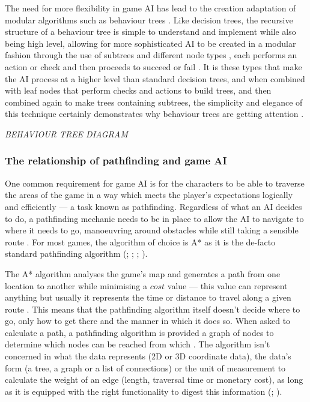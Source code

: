 \documentclass[11pt, a4paper]{article}
\begin{document}
The need for more flexibility in game AI has lead to the creation adaptation of modular algorithms such as behaviour trees \parencite[1]{lim2010evolving}. Like decision trees, the recursive structure of a behaviour tree is simple to understand and implement while also being high level, allowing for more sophisticated AI to be created in a modular fashion through the use of subtrees and different node types \parencite[144]{shoulson2011parameterizing}, each performs an action or check and then proceeds to succeed or fail \parencite[4]{lim2010evolving}. It is these types that make the AI process at a higher level than standard decision trees, and when combined with leaf nodes that perform checks and actions to build trees, and then combined again to make trees containing subtrees, the simplicity and elegance of this technique certainly demonstrates why behaviour trees are getting attention \parencite[144]{shoulson2011parameterizing}.

\emph{BEHAVIOUR TREE DIAGRAM}

\subsubsection{The relationship of pathfinding and game AI}

One common requirement for game AI is for the characters to be able to traverse the areas of the game in a way which meets the player's expectations logically and efficiently --- a task known as pathfinding. Regardless of what an AI decides to do, a pathfinding mechanic needs to be in place to allow the AI to navigate to where it needs to go, manoeuvring around obstacles while still taking a sensible route \parencite[60]{graham2003pathfinding}. For most games, the algorithm of choice is A* as it is the de-facto standard pathfinding algorithm (\cite[197]{millington2019ai}; \cite[2]{botea2004near}; \cite[64]{nareyek2004ai}; \cite[73]{leigh2007using}).

The A* algorithm analyses the game's map and generates a path from one location to another while minimising a $cost$ value --- this value can represent anything but usually it represents the time or distance to travel along a given route \parencite[44]{yap2002grid}. This means that the pathfinding algorithm itself doesn't decide where to go, only how to get there and the manner in which it does so. When asked to calculate a path, a pathfinding algorithm is provided a graph of nodes to determine which nodes can be reached from which \parencite[61]{nareyek2004ai}. The algorithm isn't concerned in what the data represents (2D or 3D coordinate data), the data's form (a tree, a graph or a list of connections) or the unit of measurement to calculate the weight of an edge (length, traversal time or monetary cost), as long as it is equipped with the right functionality to digest this information (\cite[277]{millington2019ai}; \cite[60]{graham2003pathfinding}).
\end{document}

